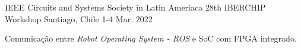 
\begin{cventries}

  \cventry
    {IEEE Circuits and Systems Society in Latin Ameriaca} %
    {28th IBERCHIP Workshop} %
    {Santiago, Chile} %
    {1-4 Mar. 2022} %
    {
      \begin{cvitems} %
        \item {Comunicação entre \textit{Robot Operating System - ROS} e SoC com FPGA integrado.}
      \end{cvitems}
    }

\end{cventries}
